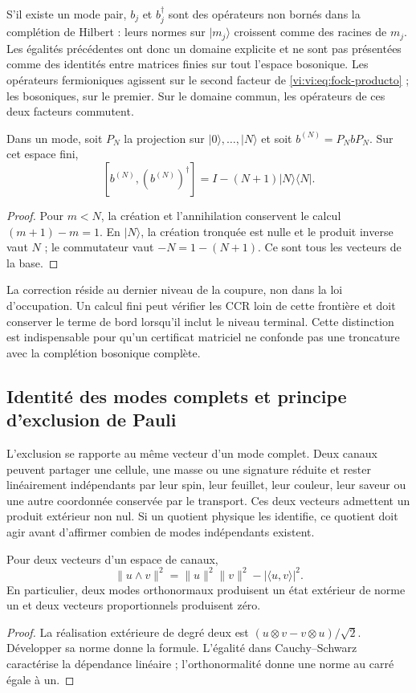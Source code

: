 S’il existe un mode pair, \(b_j\) et \(b_j^\dagger\) sont des opérateurs
non bornés dans la complétion de Hilbert : leurs normes sur
\(|m_j\rangle\) croissent comme des racines de \(m_j\). Les égalités
précédentes ont donc un domaine explicite et ne sont pas présentées
comme des identités entre matrices finies sur tout l’espace bosonique.
Les opérateurs fermioniques agissent sur le second facteur de
\eqref{vi:vi:eq:fock-producto} ; les bosoniques, sur le premier. Sur
le domaine commun, les opérateurs de ces deux facteurs commutent.

\begin{proposition}
\label{vi:vi:prop:corte-bosonico}
Dans un mode, soit \(P_N\) la projection sur
\(|0\rangle,\ldots,|N\rangle\) et soit \(b^{(N)}=P_NbP_N\).
Sur cet espace fini,
\[
 [b^{(N)},(b^{(N)})^\dagger]
 =I-(N+1)|N\rangle\langle N|.
\]
\end{proposition}
\begin{proof}
Pour \(m<N\), la création et l’annihilation conservent le calcul
\((m+1)-m=1\). En \(|N\rangle\), la création tronquée est
nulle et le produit inverse vaut \(N\) ; le commutateur vaut
\(-N=1-(N+1)\). Ce sont tous les vecteurs de la base.
\end{proof}

La correction réside au dernier niveau de la coupure, non dans la loi
d’occupation. Un calcul fini peut vérifier les CCR loin de cette
frontière et doit conserver le terme de bord lorsqu’il inclut le
niveau terminal. Cette distinction est indispensable pour qu’un
certificat matriciel ne confonde pas une troncature avec la
complétion bosonique complète.

\subsection{Identité des modes complets et principe d'exclusion de Pauli}
\label{vi:vi:subsec:pauli-etiquetas-hojas}

L’exclusion se rapporte au même vecteur d’un mode complet. Deux
canaux peuvent partager une cellule, une masse ou une signature réduite et rester
linéairement indépendants par leur spin, leur feuillet, leur couleur,
leur saveur ou une autre coordonnée conservée par le transport. Ces deux
vecteurs admettent un produit extérieur non nul. Si un quotient
physique les identifie, ce quotient doit agir avant d’affirmer
combien de modes indépendants existent.

\begin{proposition}
\label{vi:vi:prop:pauli-gram}
Pour deux vecteurs d’un espace de canaux,
\[
 \|u\wedge v\|^2
 =\|u\|^2\|v\|^2-|\langle u,v\rangle|^2.
\]
En particulier, deux modes orthonormaux produisent un état extérieur
de norme un et deux vecteurs proportionnels produisent zéro.
\end{proposition}
\begin{proof}
La réalisation extérieure de degré deux est
\((u\otimes v-v\otimes u)/\sqrt2\). Développer sa norme donne
la formule. L’égalité dans Cauchy--Schwarz caractérise la
dépendance linéaire ; l’orthonormalité donne une norme au carré égale à un.
\end{proof}

